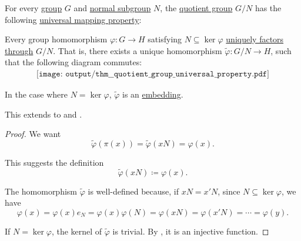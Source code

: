 \begin{theorem}\label{thm:quotient_group_universal_property}
  For every \hyperref[def:group]{group} \( G \) and \hyperref[thm:normal_subgroup_equivalences]{normal subgroup} \( N \), the \hyperref[def:group/quotient]{quotient group} \( G / N \) has the following \hyperref[rem:universal_mapping_property]{universal mapping property}:
  \begin{displayquote}
    Every group homomorphism \( \varphi: G \to H \) satisfying \( N \subseteq \ker \varphi \) \hyperref[def:factors_through]{uniquely factors through} \( G / N \). That is, there exists a unique homomorphism \( \widetilde{\varphi}: G / N \to H \), such that the following diagram commutes:
    \begin{equation}\label{eq:thm:quotient_group_universal_property/diagram}
      \begin{aligned}
        \texttt{[image: output/thm\_\_quotient\_group\_universal\_property.pdf]}
      \end{aligned}
    \end{equation}

    In the case where \( N = \ker \varphi \), \( \widetilde{\varphi} \) is an \hyperref[def:first_order_isomorphism]{embedding}.
  \end{displayquote}

  This extends to  and .
\end{theorem}
\begin{proof}
  We want
  \begin{equation*}
    \widetilde{\varphi}(\pi(x)) = \widetilde{\varphi}(xN) = \varphi(x).
  \end{equation*}

  This suggests the definition
  \begin{equation*}
    \widetilde{\varphi}(xN) \coloneqq \varphi(x).
  \end{equation*}

  The homomorphism \( \widetilde{\varphi} \) is well-defined because, if \( x N = x' N \), since \( N \subseteq \ker \varphi \), we have
  \begin{equation*}
    \varphi(x)
    =
    \varphi(x) e_N
    =
    \varphi(x) \varphi(N)
    =
    \varphi(x N)
    =
    \varphi(x' N)
    =
    \cdots
    =
    \varphi(y).
  \end{equation*}

  If \( N = \ker \varphi \), the kernel of \( \widetilde{\varphi} \) is trivial. By , it is an injective function.
\end{proof}

